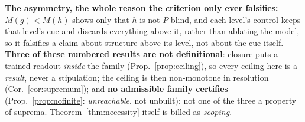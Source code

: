\noindent\textbf{The asymmetry, the whole reason the criterion only ever falsifies:} $M(g)<M(h)$ shows only that $h$ is not $P$-blind, and each level's control keeps that level's cue and discards everything above it, rather than ablating the model, so it falsifies a claim about structure above its level, not about the cue itself. \textbf{Three of these numbered results are not definitional}: closure puts a trained readout \emph{inside} the family (Prop.~\ref{prop:ceiling}), so every ceiling here is a \emph{result}, never a stipulation; the ceiling is then non-monotone in resolution (Cor.~\ref{cor:supremum}); and \textbf{no admissible family certifies} (Prop.~\ref{prop:nofinite}: \emph{unreachable}, not unbuilt); not one of the three a property of suprema. Theorem~\ref{thm:necessity} itself is billed as \emph{scoping}.

